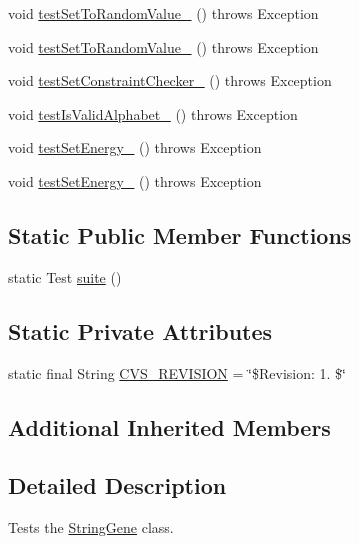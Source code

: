 \begin{DoxyCompactItemize}
\item 
void \hyperlink{classorg_1_1jgap_1_1impl_1_1_string_gene_test_a76f1dec8594d914f65b6dfc5b498cd21}{test\-Set\-To\-Random\-Value\-\_} ()  throws Exception 
\item 
void \hyperlink{classorg_1_1jgap_1_1impl_1_1_string_gene_test_a5aa270363743fa4860f53c665105417c}{test\-Set\-To\-Random\-Value\-\_} ()  throws Exception 
\item 
void \hyperlink{classorg_1_1jgap_1_1impl_1_1_string_gene_test_aa7c10a7831352fe34caeef35eb9efd77}{test\-Set\-Constraint\-Checker\-\_} ()  throws Exception 
\item 
void \hyperlink{classorg_1_1jgap_1_1impl_1_1_string_gene_test_a00215cdd98769fb23a64283178bac285}{test\-Is\-Valid\-Alphabet\-\_} ()  throws Exception 
\item 
void \hyperlink{classorg_1_1jgap_1_1impl_1_1_string_gene_test_aa378986ea4e120aaaa6ee8977d1e5eea}{test\-Set\-Energy\-\_} ()  throws Exception 
\item 
void \hyperlink{classorg_1_1jgap_1_1impl_1_1_string_gene_test_a58a5e1fa0c39082fd47bdc611c4a1877}{test\-Set\-Energy\-\_} ()  throws Exception 
\end{DoxyCompactItemize}
\subsection*{Static Public Member Functions}
\begin{DoxyCompactItemize}
\item 
static Test \hyperlink{classorg_1_1jgap_1_1impl_1_1_string_gene_test_a0013b7cad1136c04b3026a2f349ba3e6}{suite} ()
\end{DoxyCompactItemize}
\subsection*{Static Private Attributes}
\begin{DoxyCompactItemize}
\item 
static final String \hyperlink{classorg_1_1jgap_1_1impl_1_1_string_gene_test_af5e85cefc10545caddd39a1588178d1e}{C\-V\-S\-\_\-\-R\-E\-V\-I\-S\-I\-O\-N} = \char`\"{}\$Revision\-: 1. \$\char`\"{}
\end{DoxyCompactItemize}
\subsection*{Additional Inherited Members}


\subsection{Detailed Description}
Tests the \hyperlink{classorg_1_1jgap_1_1impl_1_1_string_gene}{String\-Gene} class.

